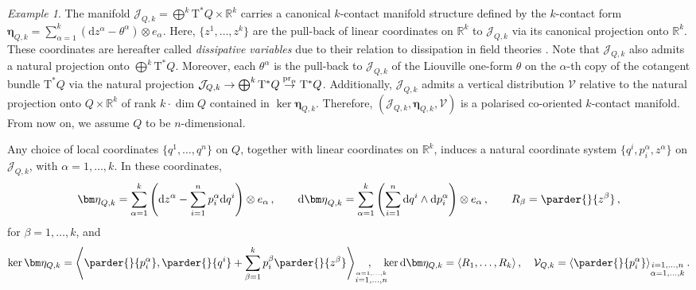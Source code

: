 \documentclass[11pt,twoside]{article}
\theoremstyle{plain}
\theoremstyle{definition}
\theoremstyle{remark}
\newtheorem{example}[theorem]{Example} %
\newcommand{\dd}{\mathrm{d}}
\newcommand{\cT}{\mathrm{T}^\ast}
\begin{document}
\begin{example} 
\label{ex:canonical-k-contact-structure}
\rm
The manifold $\mathcal{J}_{Q,k} = \bigoplus^k \cT Q \times \mathbb{R}^k$ carries a canonical $k$-contact manifold structure defined by the $k$-contact form
\(
\bm\eta_{Q,k} = \sum_{\alpha=1}^k (\dd z^\alpha - \theta^\alpha) \otimes e_\alpha.
\)
Here, $\{z^1,\dotsc,z^k\}$ are the pull-back of linear coordinates on $\mathbb{R}^k$ to $\mathcal{J}_{Q,k}$ via its canonical projection onto $\mathbb{R}^k$.  These coordinates are hereafter called {\it dissipative variables} due to their relation to dissipation in field theories \cite{Riv_22}. Note that $\mathcal{J}_{Q,k}$ also admits a natural projection onto $\bigoplus^k\cT Q$. Moreover, each $\theta^\alpha$ is the pull-back to $\mathcal{J}_{Q,k}$ of the Liouville one-form $\theta$ on the $\alpha$-th copy of the cotangent bundle $\cT Q$ via the natural projection $\mathcal{J}_{Q,k}\to \bigoplus^k\cT Q\stackrel{{\rm pr}_\alpha}{\to} \cT Q$. Additionally, $\mathcal{J}_{Q,k}$ admits a vertical distribution $\mathcal{V}$ relative to the natural projection onto $Q \times \mathbb{R}^k$   of rank $k \cdot \dim Q$ contained in $\ker \bm\eta_{Q,k}$. Therefore, $\left(\mathcal{J}_{Q,k}, \bm\eta_{Q,k}, \mathcal{V}\right)$ is a polarised co-oriented $k$-contact manifold. From now on, we assume $Q$ to be $n$-dimensional.

Any choice of local coordinates $\{q^1,\dotsc,q^n\}$ on $Q$, together with linear coordinates on $\mathbb{R}^k$, induces a natural coordinate system $\{q^i, p_i^\alpha, z^\alpha\}$ on $\mathcal{J}_{Q,k}$, with $\alpha = 1,\dotsc,k$. In these coordinates,
\[
{\bm \eta}_{Q,k}= \sum_{\alpha=1}^k\left(\dd z^\alpha - \sum_{i=1}^n p_i^\alpha \dd q^i\right)\otimes e_\alpha\,,\qquad
\dd {\bm \eta}_{Q,k}= \sum_{\alpha=1}^k\left(\sum_{i=1}^n\dd q^i \wedge \dd p_i^\alpha\right)\otimes e_\alpha\,,\qquad
R_\beta = \parder{}{z^\beta}\,,
\]
for \(\beta = 1,\dotsc,k\), and
\[
\ker \bm\eta_{Q,k} =
\left\langle
\parder{}{p_i^\alpha},
\parder{}{q^i} + \sum_{\beta=1}^k p_i^\beta \parder{}{z^\beta}
\right\rangle_{\stackrel{\alpha=1,\ldots,k}{i = 1,\dotsc,n}}\!\!\!\!\!\!\!\!\!\!\!\!,\quad
\ker \dd \bm\eta_{Q,k} =
\left\langle
R_1,\dotsc,R_k
\right\rangle,
\quad
\mathcal{V}_{Q,k}=\left\langle\parder{}{p^\alpha_i}\right\rangle_{\substack{i=1,\dotsc,n\\\alpha=1,\dotsc,k}} .
\]
\end{example}
\end{document}
